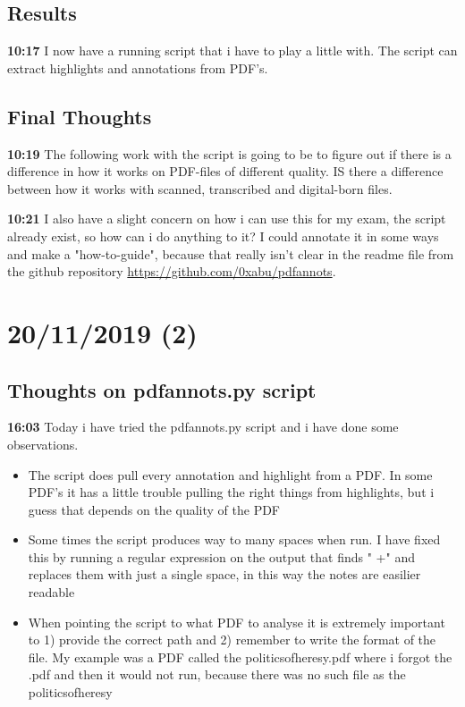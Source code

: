 \documentclass{article}
\begin{document}
\subsection{Results}
\textbf{10:17} I now have a running script that i have to play a little with. The script can extract highlights and annotations from PDF's. 
\subsection{Final Thoughts}
\textbf{10:19} The following work with the script is going to be to figure out if there is a difference in how it works on PDF-files of different quality. IS there a difference between how it works with scanned, transcribed and digital-born files.

\textbf{10:21} I also have a slight concern on how i can use this for my exam, the script already exist, so how can i do anything to it? I could annotate it in some ways and make a "how-to-guide", because that really isn't clear in the readme file from the github repository \url{https://github.com/0xabu/pdfannots}.

\section{20/11/2019 (2)}
\subsection{Thoughts on pdfannots.py script}
\textbf{16:03} Today i have tried the pdfannots.py script and i have done some observations.
\begin{itemize}
    \item The script does pull every annotation and highlight from a PDF. In some PDF's it has a little trouble pulling the right things from highlights, but i guess that depends on the quality of the PDF
    \item Some times the script produces way to many spaces when run. I have fixed this by running a regular expression on the output that finds " +" and replaces them with just a single space, in this way the notes are easilier readable
    \item When pointing the script to what PDF to analyse it is extremely important to 1) provide the correct path and 2) remember to write the format of the file. My example was a PDF called the\textunderscore
    politics\textunderscore of\textunderscore heresy.pdf where i forgot the .pdf and then it would not run, because there was no such file as the\textunderscore
    politics\textunderscore of\textunderscore heresy
    
\end{itemize}
\end{document}
